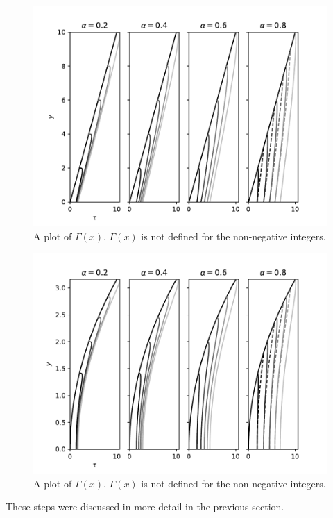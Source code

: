 \documentclass{article}
\theoremstyle{theorem}
\theoremstyle{definition}
\begin{document}
\begin{figure}[htb]
\centering
\includegraphics[width=1\textwidth]{geo_int1.pdf}
\caption{A plot of $\Gamma(x)$. $\Gamma(x)$ is not defined for the non-negative integers.}
\label{fig:geo1}
\end{figure}

\begin{figure}[htb]
\centering
\includegraphics[width=1\textwidth]{geo_int2.pdf}
\caption{A plot of $\Gamma(x)$. $\Gamma(x)$ is not defined for the non-negative integers.}
\label{fig:geo2}
\end{figure}



These steps 
were discussed in more detail in the previous section. 
\end{document}

